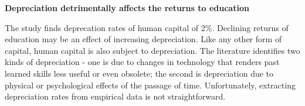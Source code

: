 \documentclass[alpha-refs]{wiley-article-04t}
\begin{document}
\hspace{-2em} \textbf{Depreciation detrimentally affects the returns to 
education}

\vspace{1em}

\noindent The study finds deprecation rates of human capital of 2\%. 
Declining 
returns of  education may be an effect of increasing depreciation. Like any 
other form of capital, human capital is also subject to depreciation. The 
literature identifies two kinds of depreciation - one is due to changes in 
technology that renders past learned skills less useful or even obsolete; 
the second is depreciation due to physical or psychological effects of the 
passage of time. Unfortunately, extracting depreciation rates from 
empirical data is not straightforward.
\end{document}
